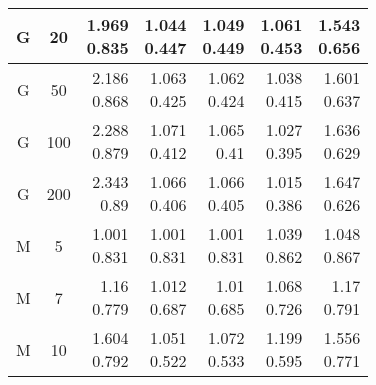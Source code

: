 \documentclass{article}
\begin{document}
{\begin{tabular}{|c c|r r r r r|}
  \hline
  G & 20 & \shortstack{ 1.969 \\ 0.835 } & \shortstack{ 1.044 \\ 0.447 } & \shortstack{ 1.049 \\ 0.449 } & \shortstack{ 1.061 \\ 0.453 } & \shortstack{ 1.543 \\ 0.656 } \\ 
  \hline
  G & 50 & \shortstack{ 2.186 \\ 0.868 } & \shortstack{ 1.063 \\ 0.425 } & \shortstack{ 1.062 \\ 0.424 } & \shortstack{ 1.038 \\ 0.415 } & \shortstack{ 1.601 \\ 0.637 } \\ 
  \hline
  G & 100 & \shortstack{ 2.288 \\ 0.879 } & \shortstack{ 1.071 \\ 0.412 } & \shortstack{ 1.065 \\ 0.41 } & \shortstack{ 1.027 \\ 0.395 } & \shortstack{ 1.636 \\ 0.629 } \\ 
  \hline
  G & 200 & \shortstack{ 2.343 \\ 0.89 } & \shortstack{ 1.066 \\ 0.406 } & \shortstack{ 1.066 \\ 0.405 } & \shortstack{ 1.015 \\ 0.386 } & \shortstack{ 1.647 \\ 0.626 } \\ 
  \hline\hline
  M & 5 & \shortstack{ 1.001 \\ 0.831 } & \shortstack{ 1.001 \\ 0.831 } & \shortstack{ 1.001 \\ 0.831 } & \shortstack{ 1.039 \\ 0.862 } & \shortstack{ 1.048 \\ 0.867 } \\ 
  \hline
  M & 7 & \shortstack{ 1.16 \\ 0.779 } & \shortstack{ 1.012 \\ 0.687 } & \shortstack{ 1.01 \\ 0.685 } & \shortstack{ 1.068 \\ 0.726 } & \shortstack{ 1.17 \\ 0.791 } \\ 
  \hline
  M & 10 & \shortstack{ 1.604 \\ 0.792 } & \shortstack{ 1.051 \\ 0.522 } & \shortstack{ 1.072 \\ 0.533 } & \shortstack{ 1.199 \\ 0.595 } & \shortstack{ 1.556 \\ 0.771 } \\ 

\end{tabular}}
\end{document}
